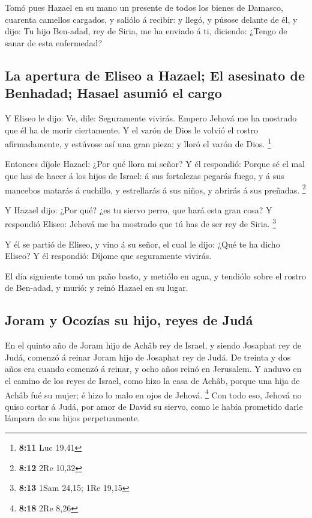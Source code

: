  Tomó pues Hazael en su mano un presente de todos los
bienes de Damasco, cuarenta camellos cargados, y saliólo á recibir: y
llegó, y púsose delante de él, y dijo: Tu hijo Ben-adad, rey de Siria,
me ha enviado á ti, diciendo: ¿Tengo de sanar de esta enfermedad?

\hypertarget{la-apertura-de-eliseo-a-hazael-el-asesinato-de-benhadad-hasael-asumiuxf3-el-cargo}{%
\subsection{La apertura de Eliseo a Hazael; El asesinato de Benhadad;
Hasael asumió el
cargo}\label{la-apertura-de-eliseo-a-hazael-el-asesinato-de-benhadad-hasael-asumiuxf3-el-cargo}}

 Y Eliseo le dijo: Ve, dile: Seguramente vivirás. Empero
Jehová me ha mostrado que él ha de morir ciertamente.  Y
el varón de Dios le volvió el rostro afirmadamente, y estúvose así una
gran pieza; y lloró el varón de Dios. \footnote{\textbf{8:11} Luc 19,41}

 Entonces díjole Hazael: ¿Por qué llora mi señor? Y él
respondió: Porque sé el mal que has de hacer á los hijos de Israel: á
sus fortalezas pegarás fuego, y á sus mancebos matarás á cuchillo, y
estrellarás á sus niños, y abrirás á sus preñadas. \footnote{\textbf{8:12}
  2Re 10,32}

 Y Hazael dijo: ¿Por qué? ¿es tu siervo perro, que hará
esta gran cosa? Y respondió Eliseo: Jehová me ha mostrado que tú has de
ser rey de Siria. \footnote{\textbf{8:13} 1Sam 24,15; 1Re 19,15}

 Y él se partió de Eliseo, y vino á su señor, el cual le
dijo: ¿Qué te ha dicho Eliseo? Y él respondió: Díjome que seguramente
vivirás.

 El día siguiente tomó un paño basto, y metiólo en agua,
y tendiólo sobre el rostro de Ben-adad, y murió: y reinó Hazael en su
lugar.

\hypertarget{joram-y-ocozuxedas-su-hijo-reyes-de-juduxe1}{%
\subsection{Joram y Ocozías su hijo, reyes de
Judá}\label{joram-y-ocozuxedas-su-hijo-reyes-de-juduxe1}}

 En el quinto año de Joram hijo de Achâb rey de Israel, y
siendo Josaphat rey de Judá, comenzó á reinar Joram hijo de Josaphat rey
de Judá.  De treinta y dos años era cuando comenzó á
reinar, y ocho años reinó en Jerusalem.  Y anduvo en el
camino de los reyes de Israel, como hizo la casa de Achâb, porque una
hija de Achâb fué su mujer; é hizo lo malo en ojos de Jehová.
\footnote{\textbf{8:18} 2Re 8,26}  Con todo eso, Jehová
no quiso cortar á Judá, por amor de David su siervo, como le había
prometido darle lámpara de sus hijos perpetuamente.

